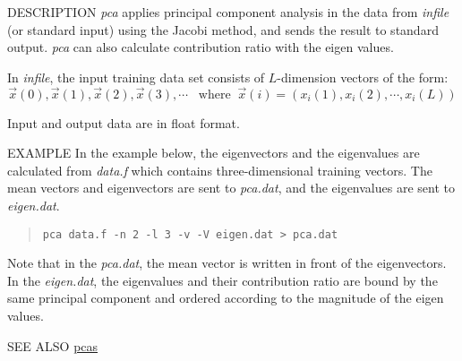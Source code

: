 \begin{synopsis}
 \item[pca] [ --l $L$ ] [ --n $N$] [ --i $I$] [ --e $e$]
 [ --v ]  [ --V $fn$ ] [ {\em infile} ] 
\end{synopsis}

\begin{qsection}{DESCRIPTION}
 {\em pca} applies principal component analysis
 in the data from {\em infile} (or standard input) using the Jacobi method,
 and sends the result to standard output.
 {\em pca} can also calculate contribution ratio with the eigen values.

 In {\em infile},
 the input training data set consists of $L$-dimension vectors of the form:
 \[
 \Vec{x}(0), \Vec{x}(1), \Vec{x}(2), \Vec{x}(3), \cdots \;\;\;
 \mathrm{where}\;\;\Vec{x}(i) = (x_{i}(1), x_{i}(2), \cdots, x_{i}(L))
 \]

Input and output data are in float format. 
\end{qsection}

\begin{options}
\end{options}

\begin{qsection}{EXAMPLE}
 In the example below,
 the eigenvectors and the eigenvalues are
 calculated  from {\em data.f}
 which contains three-dimensional training vectors.
 The mean vectors and eigenvectors are sent to
 {\em pca.dat}, and the eigenvalues are sent to {\em eigen.dat}.
\begin{quote}
  \verb!pca data.f -n 2 -l 3 -v -V eigen.dat > pca.dat!
\end{quote} 
Note that in the {\em pca.dat}, the mean vector is written in front of
the eigenvectors.
In the {\em eigen.dat}, 
the eigenvalues and their contribution ratio are bound by
the same principal component and ordered according to the
magnitude of the eigen values.
\end{qsection} 
\begin{qsection}{SEE ALSO}
 \hyperlink{pcas}{pcas}
\end{qsection}
